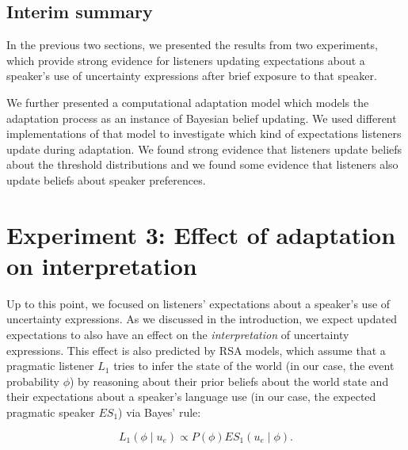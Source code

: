 \documentclass[man, floatsintext]{apa6}
\begin{document}
\subsection{Interim summary}

In the previous two sections, we presented the results from two experiments, which provide strong evidence for
listeners updating expectations about a speaker's use of uncertainty expressions after brief
exposure to that speaker. 

We further presented a computational adaptation model which models the adaptation
process as an instance of Bayesian belief updating. We used different implementations
of that model to investigate which kind of expectations listeners update during adaptation.
We found strong evidence that listeners update beliefs about the threshold distributions and 
we found some evidence that
listeners also update beliefs about speaker preferences.

\section{Experiment 3: Effect of adaptation on interpretation}
\label{sec:exp-model-interpretation}


Up to this point, we focused on listeners' expectations about a speaker's use of uncertainty expressions. As we discussed
in the introduction, we expect updated expectations to also have an effect on the \emph{interpretation} of uncertainty expressions. This
effect is also predicted by RSA models,  which assume that a pragmatic listener $L_1$ tries to infer the state of the world (in our case, the event probability $\phi$) by reasoning
about their prior beliefs about the world state and their expectations about a speaker's language use (in our case, the expected pragmatic speaker $ES_{1}$) via Bayes' rule:

$$ L_1(\phi \mid u_e) \propto P(\phi) ES_1(u_e \mid \phi).$$
\end{document}

